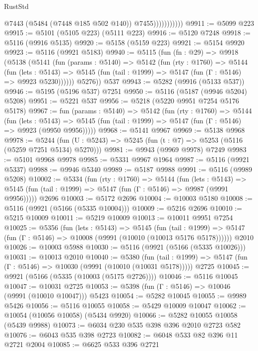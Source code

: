 \begin{lexlean}{RustStd}
\begin{coremodule}
{\begin{coremodule}
{{{{{{{{{{{{{{{{{{{{{{{{{{{{{{{                          @7443
                          (@5484 (@7448 @185 @502 @140))
                          @7455)))))))))))
@9911 := @5099 @223
@9915 := @5101 (@5105 @223) (@5111 @223)
@9916 := @5120 @7248
@9918 := @5116 (@9916 @5135)
@9920 := @5158 (@5159 @223)
@9921 := @5154 @9920
@9923 := @5116 (@9921 @5183)
@9940 := @5115
    (fun (fn : @29) =>
    @9918
      (@5138
        (@5141
          (fun (params : @5140) =>
          @5142
            (fun (rty : @1760) =>
            @5144
              (fun (lets : @5143) =>
              @5145 (fun (tail : @1999) => @5147 (fun (Γ : @5146) => @9923 @5230))))))
        @5276))
    @537
@9943 := @5282 (@9916 (@5133 @537))
@9946 := @5195 (@5196 @537) @7251
@9950 := @5116 (@5187 (@9946 @5204) @5208)
@9951 := @5221 @537
@9956 := @5218 (@5220 @9951 @7254 @5176 @5178)
@9967 := fun (params : @5140) =>
  @5142
    (fun (rty : @1760) =>
    @5144
      (fun (lets : @5143) =>
      @5145 (fun (tail : @1999) => @5147 (fun (Γ : @5146) => @9923 (@9950 @9956)))))
@9968 := @5141 @9967
@9969 := @5138 @9968
@9978 := @5244 (fun (U : @5243) => @5245 (fun (t : @7) => @5253 (@5116 (@5259 @7251 @5134) @5270)))
@9981 := @9943 (@9969 @9978) @7249
@9983 := @5101 @9968 @9978
@9985 := @5331 @9967 @1964
@9987 := @5116 (@9921 @5337)
@9988 := @9946 @5340
@9989 := @5187 @9988
@9991 := @5116 (@9989 @5208)
@10002 := @5334
    (fun (rty : @1760) =>
    @5144
      (fun (lets : @5143) =>
      @5145 (fun (tail : @1999) => @5147 (fun (Γ : @5146) => @9987 (@9991 @9956)))))
    @2696
@10003 := @5172 @2696
@10004 := @10003 @5180
@10008 := @5116 (@9921 (@5166 (@5335 @10004)))
@10009 := @5216 @2696
@10010 := @5215 @10009
@10011 := @5219 @10009
@10013 := @10011 @9951 @7254
@10025 := @5356
    (fun (lets : @5143) =>
    @5145
      (fun (tail : @1999) =>
      @5147 (fun (Γ : @5146) => @10008 (@9991 (@10010 (@10013 @5176 @5178))))))
    @2010
@10026 := @10003 @5988
@10030 := @5116 (@9921 (@5166 (@5335 @10026)))
@10031 := @10013 @2010
@10040 := @5380
    (fun (tail : @1999) => @5147 (fun (Γ : @5146) => @10030 (@9991 (@10010 (@10031 @5178)))))
    @2725
@10045 := @9921 (@5166 (@5335 (@10003 (@5175 @2726))))
@10046 := @5116 @10045
@10047 := @10031 @2725
@10053 := @5398 (fun (Γ : @5146) => @10046 (@9991 (@10010 @10047))) @5423
@10054 := @5282 @10045
@10055 := @9989 @5426
@10056 := @5116 @10055
@10058 := @5429 @10009 @10047
@10062 := @10054 (@10056 @10058) (@5434 @9920)
@10066 := @5282 @10055 @10058 (@5439 @9988)
@10073 := @6034 @230 @535 @398 @396 @2010 @2723 @582
@10076 := @6043 @535 @398 @2723
@10082 := @6048 @533 @82 @396 @11 @2721 @2004
@10085 := @6625 @533 @396 @2721
}}}}}}}}}}}}}}}}}}}}}}}}}}}}}}}
\end{coremodule}}
\end{coremodule}
\end{lexlean}
